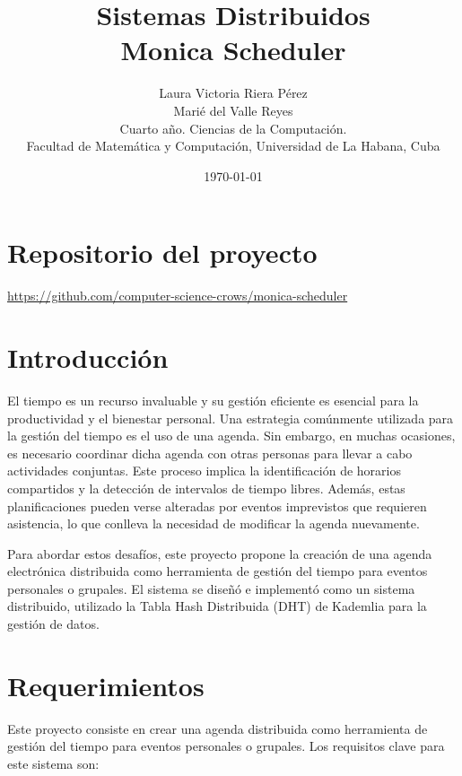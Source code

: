 \documentclass[10pt]{article} %
\title{\normalsize{Sistemas Distribuidos}\\
	\Huge\bfseries Monica Scheduler \\
} %
\author{%
	Laura Victoria Riera P\'erez\\
	Mari\'e del Valle Reyes \vspace{1em} \\
	\small Cuarto a\~no. Ciencias de la Computaci\'on. \\ %
	\small Facultad de Matem\'atica y Computaci\'on, Universidad de La Habana, Cuba \\ %
}
\date{\footnotesize \today } %
\begin{document}
	
	
	
	\maketitle
	
	
	\section*{Repositorio del proyecto}
	
	\begin{center}
		\href{https://github.com/computer-science-crows/monica-scheduler}{https://github.com/computer-science-crows/monica-scheduler}
	\end{center}

	\section{Introducción}
	
	El tiempo es un recurso invaluable y su gestión eficiente es esencial para la productividad y el bienestar personal. Una estrategia comúnmente utilizada para la gestión del tiempo es el uso de una agenda. Sin embargo, en muchas ocasiones, es necesario coordinar dicha agenda con otras personas para llevar a cabo actividades conjuntas. Este proceso implica la identificación de horarios compartidos y la detección de intervalos de tiempo libres. Además, estas planificaciones pueden verse alteradas por eventos imprevistos que requieren asistencia, lo que conlleva la necesidad de modificar la agenda nuevamente.
	
	Para abordar estos desafíos, este proyecto propone la creación de una agenda electrónica distribuida como herramienta de gestión del tiempo para eventos personales o grupales. El sistema se diseñó e implementó como un sistema distribuido, utilizado la Tabla Hash Distribuida (DHT) de Kademlia para la gestión de datos.
	
	\section{Requerimientos}
	
	Este proyecto consiste en crear una agenda distribuida como herramienta de gestión del tiempo para eventos personales o grupales. Los requisitos clave para este sistema son:
	
\end{document}
